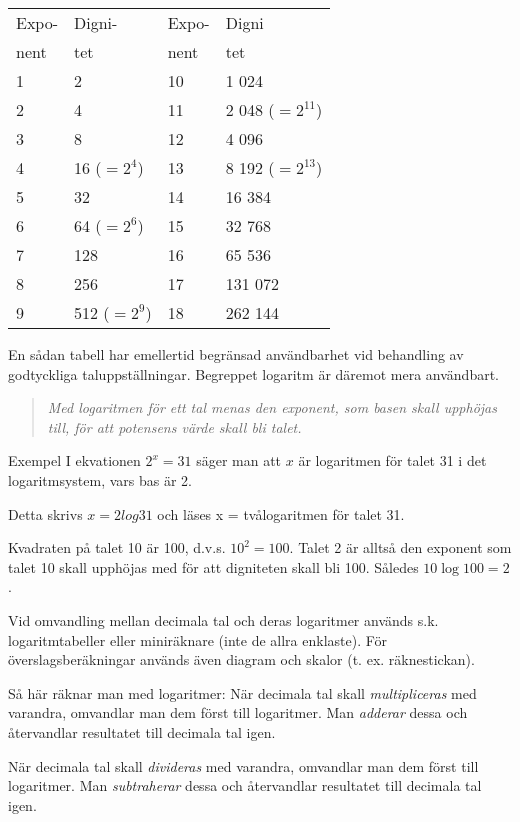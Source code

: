 \begin{tabular}{ll|ll}
Expo- & Digni-       & Expo- & Digni            \\
nent  & tet          & nent  & tet              \\ \hline
1     & 2            & 10    & 1 024            \\
2     & 4            & 11    & 2 048 (\(=2^{11}\)) \\
3     & 8            & 12    & 4 096            \\
4     & 16 (\(=2^4\))  & 13    & 8 192 (\(=2^{13}\)) \\
5     & 32           & 14    & 16 384           \\
6     & 64 (\(=2^6\))  & 15    & 32 768           \\
7     & 128          & 16    & 65 536           \\
8     & 256          & 17    & 131 072          \\
9     & 512 (\(=2^9\)) & 18    & 262 144
\end{tabular}

En sådan tabell har emellertid begränsad
användbarhet vid behandling av godtyckliga
taluppställningar. Begreppet logaritm är däremot mera användbart.

\begin{quote}\emph{
Med logaritmen för ett tal menas den exponent, som basen skall upphöjas till,
för att potensens värde skall bli talet.
}\end{quote}

Exempel
I ekvationen \(2^x = 31\) säger man att \(x\) är logaritmen för talet 31 i det
logaritmsystem, vars bas är 2.

Detta skrivs \(x= 2log 31\) och läses x = tvålogaritmen för talet 31.

Kvadraten på talet 10 är 100, d.v.s. \(10^2 = 100\). Talet 2 är alltså den
exponent som talet 10 skall upphöjas med för att digniteten skall bli 100.
Således \(10\log 100 = 2\).

Vid omvandling mellan decimala tal och deras logaritmer används s.k.
logaritmtabeller eller miniräknare (inte de allra enklaste). För
överslagsberäkningar används även diagram och skalor (t. ex. räknestickan).

Så här räknar man med logaritmer:
När decimala tal skall \emph{multipliceras} med varandra, omvandlar man dem
först till logaritmer. Man \emph{adderar} dessa och återvandlar resultatet till
decimala tal igen.

När decimala tal skall \emph{divideras} med varandra, omvandlar man dem först
till logaritmer. Man \emph{subtraherar} dessa och återvandlar resultatet till
decimala tal igen.

